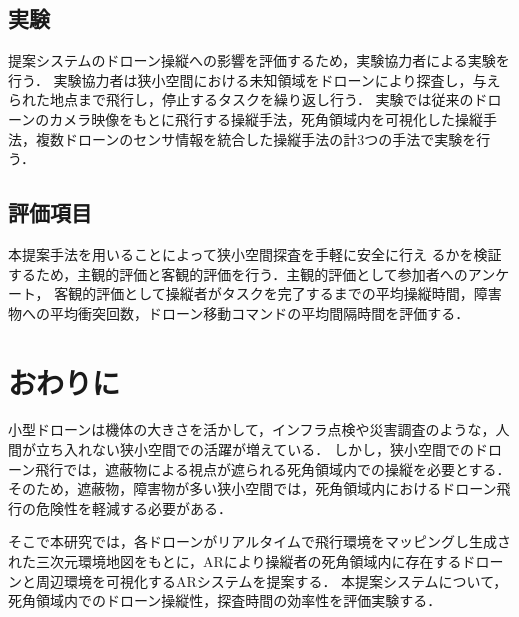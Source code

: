 \documentclass[a4paper,10pt,twocolumn,uplatex]{jsarticle}
\begin{document}
\subsection{実験}
提案システムのドローン操縦への影響を評価するため，実験協力者による実験を行う．
実験協力者は狭小空間における未知領域をドローンにより探査し，与えられた地点まで飛行し，停止するタスクを繰り返し行う．
実験では従来のドローンのカメラ映像をもとに飛行する操縦手法，死角領域内を可視化した操縦手法，複数ドローンのセンサ情報を統合した操縦手法の計3つの手法で実験を行う．



\subsection{評価項目}
本提案手法を用いることによって狭小空間探査を手軽に安全に行え
るかを検証するため，主観的評価と客観的評価を行う．主観的評価として参加者へのアンケート，
客観的評価として操縦者がタスクを完了するまでの平均操縦時間，障害物への平均衝突回数，ドローン移動コマンドの平均間隔時間を評価する．


\section{おわりに}

小型ドローンは機体の大きさを活かして，インフラ点検や災害調査のような，人間が立ち入れない狭小空間での活躍が増えている．
しかし，狭小空間でのドローン飛行では，遮蔽物による視点が遮られる死角領域内での操縦を必要とする．
そのため，遮蔽物，障害物が多い狭小空間では，死角領域内におけるドローン飛行の危険性を軽減する必要がある．
\par
そこで本研究では，各ドローンがリアルタイムで飛行環境をマッピングし生成された三次元環境地図をもとに，ARにより操縦者の死角領域内に存在するドローンと周辺環境を可視化するARシステムを提案する．
本提案システムについて，死角領域内でのドローン操縦性，探査時間の効率性を評価実験する．
\end{document}
